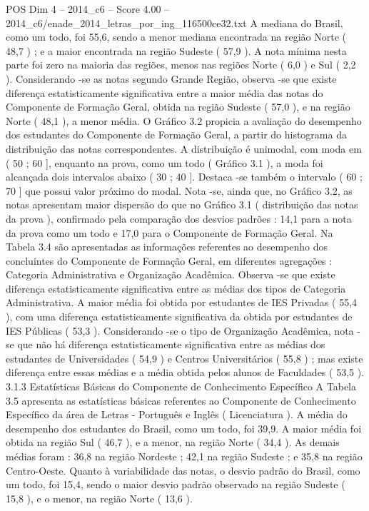 \begin{textsample}{POS Dim 4 – 2014\_c6 – Score 4.00 – 2014\_c6/enade\_2014\_letras\_por\_ing\_116500ce32.txt}
A mediana do Brasil, como um todo, foi 55,6, sendo a menor mediana encontrada na região Norte ( 48,7 ) ; e a maior encontrada na região Sudeste ( 57,9 ).
A nota mínima nesta parte foi zero na maioria das regiões, menos nas regiões Norte ( 6,0 ) e Sul ( 2,2 ).
Considerando -se as notas segundo Grande Região, observa -se que existe diferença estatisticamente significativa entre a maior média das notas do Componente de Formação Geral, obtida na região Sudeste ( 57,0 ), e na região Norte ( 48,1 ), a menor média.
O Gráfico 3.2 propicia a avaliação do desempenho dos estudantes do Componente de Formação Geral, a partir do histograma da distribuição das notas correspondentes.
A distribuição é unimodal, com moda em ( 50 ; 60 ], enquanto na prova, como um todo ( Gráfico 3.1 ), a moda foi alcançada dois intervalos abaixo ( 30 ; 40 ].
Destaca -se também o intervalo ( 60 ; 70 ] que possui valor próximo do modal.
Nota -se, ainda que, no Gráfico 3.2, as notas apresentam maior dispersão do que no Gráfico 3.1 ( distribuição das notas da prova ), confirmado pela comparação dos desvios padrões : 14,1 para a nota da prova como um todo e 17,0 para o Componente de Formação Geral.
Na Tabela 3.4 são apresentadas as informações referentes ao desempenho dos concluintes do Componente de Formação Geral, em diferentes agregações : Categoria Administrativa e Organização Acadêmica.
Observa -se que existe diferença estatisticamente significativa entre as médias dos tipos de Categoria Administrativa.
A maior média foi obtida por estudantes de IES Privadas ( 55,4 ), com uma diferença estatisticamente significativa da obtida por estudantes de IES Públicas ( 53,3 ).
Considerando -se o tipo de Organização Acadêmica, nota -se que não há diferença estatisticamente significativa entre as médias dos estudantes de Universidades ( 54,9 ) e Centros Universitários ( 55,8 ) ; mas existe diferença entre essas médias e a média obtida pelos alunos de Faculdades ( 53,5 ). 3.1.3 Estatísticas Básicas do Componente de Conhecimento Específico A Tabela 3.5 apresenta as estatísticas básicas referentes ao Componente de Conhecimento Específico da área de Letras - Português e Inglês ( Licenciatura ).
A média do desempenho dos estudantes do Brasil, como um todo, foi 39,9.
A maior média foi obtida na região Sul ( 46,7 ), e a menor, na região Norte ( 34,4 ).
As demais médias foram : 36,8 na região Nordeste ; 42,1 na região Sudeste ; e 35,8 na região Centro-Oeste.
Quanto à variabilidade das notas, o desvio padrão do Brasil, como um todo, foi 15,4, sendo o maior desvio padrão observado na região Sudeste ( 15,8 ), e o menor, na região Norte ( 13,6 ).

\end{textsample}
